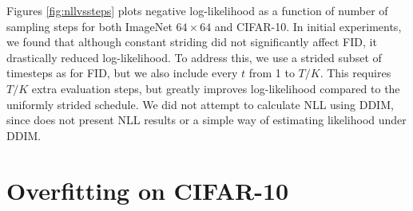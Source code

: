 \documentclass{article}
\begin{document}
Figures \ref{fig:nllvssteps} plots negative log-likelihood as a function of number of sampling steps for both ImageNet $64 \times 64$ and CIFAR-10. In initial experiments, we found that although constant striding did not significantly affect FID, it drastically reduced log-likelihood. To address this, we use a strided subset of timesteps as for FID, but we also include every $t$ from 1 to $T/K$. This requires $T/K$ extra evaluation steps, but greatly improves log-likelihood compared to the uniformly strided schedule. We did not attempt to calculate NLL using DDIM, since \citet{ddim} does not present NLL results or a simple way of estimating likelihood under DDIM.

\clearpage

\section{Overfitting on CIFAR-10}
\label{app:overfitting}
\end{document}
